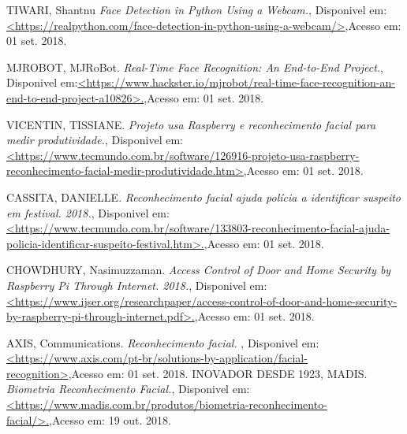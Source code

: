 \documentclass[conference,compsoc]{IEEEtran}
\begin{document}

\begin{thebibliography}{1}




{TIWARI, Shantnu
\emph{Face Detection in Python Using a Webcam.},
 {Disponivel em:\url{<https://realpython.com/face-detection-in-python-using-a-webcam/>}},{Acesso em: 01 set. 2018.}
}

{MJROBOT, MJRoBot.
\emph{Real-Time Face Recognition: An End-to-End Project.},
 {Disponivel em:\url{<https://www.hackster.io/mjrobot/real-time-face-recognition-an-end-to-end-project-a10826>.}},{Acesso em: 01 set. 2018.}
}

{VICENTIN, TISSIANE.
\emph{Projeto usa Raspberry e reconhecimento facial para medir produtividade.},
 {Disponivel em:\url{<https://www.tecmundo.com.br/software/126916-projeto-usa-raspberry-reconhecimento-facial-medir-produtividade.htm>}},{Acesso em: 01 set. 2018.}
}

{CASSITA, DANIELLE.
\emph{Reconhecimento facial ajuda polícia a identificar suspeito em festival. 2018.},
 {Disponivel em:\url{<https://www.tecmundo.com.br/software/133803-reconhecimento-facial-ajuda-policia-identificar-suspeito-festival.htm>.}},{Acesso em: 01 set. 2018.}
}

{CHOWDHURY, Nasimuzzaman.
\emph{Access Control of Door and Home Security by Raspberry Pi Through Internet. 2018.},
 {Disponivel em:\url{<https://www.ijser.org/researchpaper/access-control-of-door-and-home-security-by-raspberry-pi-through-internet.pdf>.}},{Acesso em: 01 set. 2018.}
}

{AXIS, Communications.
\emph{Reconhecimento facial. },
 {Disponivel em:\url{<https://www.axis.com/pt-br/solutions-by-application/facial-recognition>}},{Acesso em: 01 set. 2018.}
}
{INOVADOR DESDE 1923, MADIS.
\emph{Biometria Reconhecimento Facial.},
 {Disponivel em:\url{<https://www.madis.com.br/produtos/biometria-reconhecimento-facial/>.}},{Acesso em: 19 out. 2018.}
}


\end{thebibliography}




\end{document}
